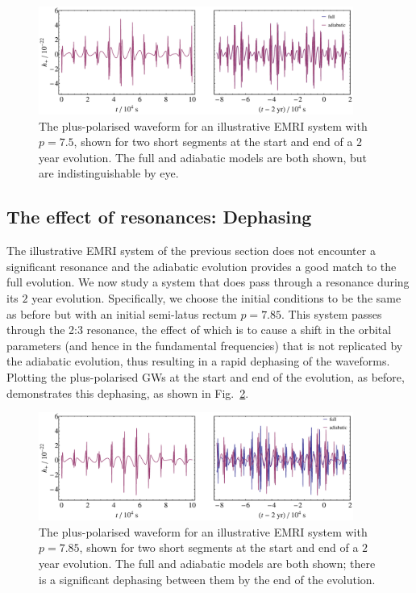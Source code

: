 \documentclass[aps,prd,amsfonts,amssymb,amsmath,nofootinbib,showpacs,superscriptaddress,twocolumn]{revtex4}
\newcommand{\figref}[1]{Fig.\ \ref{fig:#1}}
\begin{document}
\begin{figure}[htbp]
\centering
\includegraphics[width=0.92\textwidth]{Fig_good_waveform}
\caption{\label{fig:good-waveform}The plus-polarised waveform for an illustrative EMRI system with $p=7.5$, shown for two short segments at the start and end of a $2$ year evolution. The full and adiabatic models are both shown, but are indistinguishable by eye.}
\end{figure}

\subsection{The effect of resonances: Dephasing}

The illustrative EMRI system of the previous section does not encounter a significant resonance and the adiabatic evolution provides a good match to the full evolution. We now study a system that does pass through a resonance during its $2$ year evolution. Specifically, we choose the initial conditions to be the same as before but with an initial semi-latus rectum $p=7.85$. This system passes through the 2:3 resonance, the effect of which is to cause a shift in the orbital parameters (and hence in the fundamental frequencies) that is not replicated by the adiabatic evolution, thus resulting in a rapid dephasing of the waveforms. Plotting the plus-polarised GWs at the start and end of the evolution, as before, demonstrates this dephasing, as shown in \figref{dephased-waveform}.

\begin{figure}[htbp]
\centering
\includegraphics[width=0.92\textwidth]{Fig_dephased_waveform}
\caption{\label{fig:dephased-waveform}The plus-polarised waveform for an illustrative EMRI system with $p=7.85$, shown for two short segments at the start and end of a $2$ year evolution. The full and adiabatic models are both shown; there is a significant dephasing between them by the end of the evolution.}
\end{figure}
\end{document}

